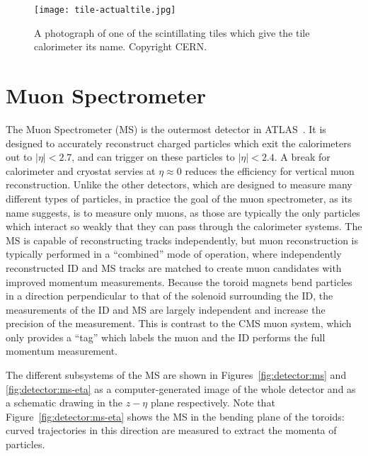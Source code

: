 

\begin{figure}
\centering
\texttt{[image: tile-actualtile.jpg]}
\label{fig:detector:actualtile}
\caption{A photograph of one of the scintillating tiles which give the tile calorimeter its name. Copyright CERN.}
\end{figure}





\section{Muon Spectrometer}

The Muon Spectrometer (MS) is the outermost detector in ATLAS~\cite{ATLASPaper,ATLASMS}. It is designed to accurately reconstruct charged particles which exit the calorimeters out to $|\eta| < 2.7$, and can trigger on these particles to $|\eta| < 2.4$. A break for calorimeter and cryostat servies at $\eta \approx 0$ reduces the efficiency for vertical muon reconstruction.  Unlike the other detectors, which are designed to measure many different types of particles, in practice the goal of the muon spectrometer, as its name suggests, is to measure only muons, as those are typically the only particles which interact so weakly that they can pass through the calorimeter systems. The MS is capable of reconstructing tracks independently, but muon reconstruction is typically performed in a ``combined'' mode of operation, where independently reconstructed ID and MS tracks are matched to create muon candidates with improved momentum measurements. Because the toroid magnets bend particles in a direction perpendicular to that of the solenoid surrounding the ID, the measurements of the ID and MS are largely independent and increase the precision of the measurement. This is contrast to the CMS muon system, which only provides a ``tag'' which labels the muon and the ID performs the full momentum measurement.

The different subsystems of the MS are shown in Figures~\ref{fig:detector:ms} and \ref{fig:detector:ms-eta} as a computer-generated image of the whole detector and as a schematic drawing in the $z-\eta$ plane respectively. Note that Figure~\ref{fig:detector:ms-eta} shows the MS in the bending plane of the toroids: curved trajectories in this direction are measured to extract the momenta of particles. 


